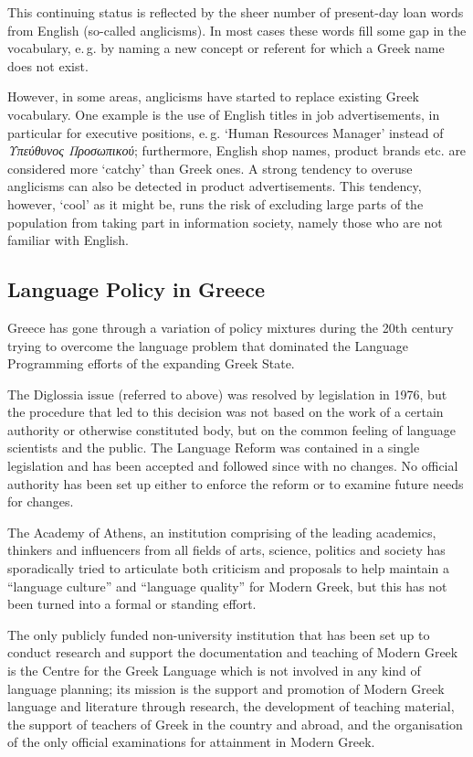 \documentclass[]{../../metanetpaper}
\begin{document}
\begin{multicols}{2}
This continuing status is reflected by the sheer number of present-day loan words from English (so-called anglicisms). In most cases these words fill some gap in the vocabulary, e.\,g. by naming a new concept or referent for which a Greek name does not exist.

However, in some areas, anglicisms have started to replace existing Greek vocabulary. One example is the use of English titles in job advertisements, in particular for executive positions, e.\,g. ‘Human Resources Manager’ instead of \textit{Υπεύθυνος Προσωπικού}; furthermore, English shop names, product brands etc. are considered more ‘catchy’ than Greek ones. A strong tendency to overuse anglicisms can also be detected in product advertisements. This tendency, however, ‘cool’ as it might be, runs the risk of excluding large parts of the population from taking part in information society, namely those who are not familiar with English.

\subsection{Language Policy in Greece}

Greece has gone through a variation of policy mixtures during the 20th century trying to overcome the language problem that dominated the Language Programming efforts of the expanding Greek State.

The Diglossia issue (referred to above) was resolved by legislation in 1976, but the procedure that led to this decision was not based on the work of a certain authority or otherwise constituted body, but on the common feeling of language scientists and the public. The Language Reform was contained in a single legislation and has been accepted and followed since with no changes. No official authority has been set up either to enforce the reform or to examine future needs for changes.

The Academy of Athens, an institution comprising of the leading academics, thinkers and influencers from all fields of arts, science, politics and society has sporadically tried to articulate both criticism and proposals to help maintain a “language culture” and “language quality” for Modern Greek, but this has not been turned into a formal or standing effort.

The only publicly funded non-university institution that has been set up to conduct research and support the documentation and teaching of Modern Greek is the Centre for the Greek Language which is not involved in any kind of language planning; its mission is the support and promotion of Modern Greek language and literature through research, the development of teaching material, the support of teachers of Greek in the country and abroad, and the organisation of the only official examinations for attainment in Modern Greek.


\end{multicols}
\end{document}
